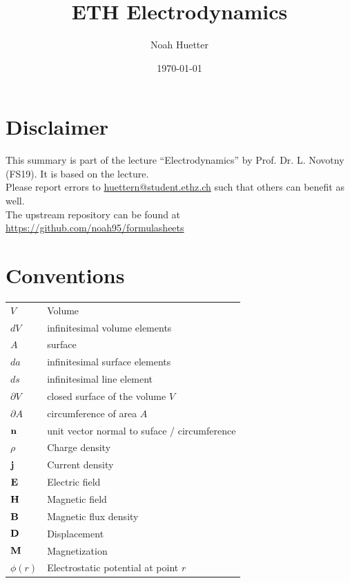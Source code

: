 \documentclass[a4paper, fontsize=8pt, landscape, DIV=1]{scrartcl}
\title{ETH Electrodynamics}
\author{Noah Huetter}
\date{\today}
\begin{document}
\setcounter{secnumdepth}{2} %
\begin{multicols*}{4}
	\section*{Disclaimer}
	This summary is part of the lecture ``Electrodynamics'' by Prof. Dr. L. Novotny (FS19). It is based on the lecture. \\[6pt]
	Please report errors to \href{mailto:huettern@student.ethz.ch}{huettern@student.ethz.ch} such that others can benefit as well.\\[6pt]	
  The upstream repository can be found at \href{https://github.com/noah95/formulasheets}{https://github.com/noah95/formulasheets}
	\vfill\null
	\pagebreak
  \maketitle 
  \thispagestyle{fancy}

  \section{Conventions}
  \begin{tabular}[h]{l l}
    $V$ & Volume \\
    $dV$ & infinitesimal volume elements \\
    $A$ & surface \\
    $da$ & infinitesimal surface elements \\
    $ds$ & infinitesimal line element \\
    $\partial V$ & closed surface of the volume $V$ \\
    $\partial A$ & circumference of area $A$ \\
    $\mathbf{n}$ & unit vector normal to suface / circumference \\
    $\rho$ & Charge density \\
    $\mathbf{j}$ & Current density \\
    $\mathbf{E}$ & Electric field \\
    $\mathbf{H}$ & Magnetic field \\
    $\mathbf{B}$ & Magnetic flux density \\
    $\mathbf{D}$ & Displacement \\
    $\mathbf{M}$ & Magnetization \\
    $\phi(r)$ & Electrostatic potential at point $r$
  \end{tabular}

\end{multicols*}
\end{document}
